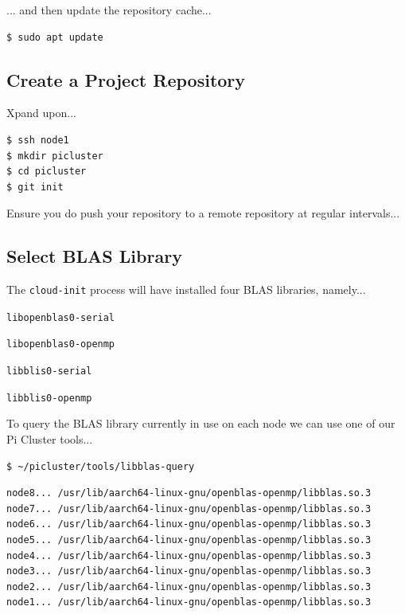 \documentclass{report}
\begin{document}
... and then update the repository cache...

\lstset{style=type}
\begin{lstlisting}[]
$ sudo apt update
\end{lstlisting}



\subsection{Create a Project Repository}

Xpand upon...

\lstset{style=type}
\begin{lstlisting}[]
$ ssh node1
$ mkdir picluster
$ cd picluster
$ git init
\end{lstlisting}

Ensure you do push your repository to a remote repository at regular intervals...


\subsection{Select BLAS Library}

The \verb|cloud-init| process will have installed four BLAS libraries, namely...

\verb|libopenblas0-serial|

\verb|libopenblas0-openmp|

\verb|libblis0-serial|

\verb|libblis0-openmp|

To query the BLAS library currently in use on each node we can use one of our Pi Cluster tools...

\lstset{style=type}
\begin{lstlisting}[]
$ ~/picluster/tools/libblas-query
\end{lstlisting}

\lstset{style=type}
\begin{lstlisting}[]
node8... /usr/lib/aarch64-linux-gnu/openblas-openmp/libblas.so.3
node7... /usr/lib/aarch64-linux-gnu/openblas-openmp/libblas.so.3
node6... /usr/lib/aarch64-linux-gnu/openblas-openmp/libblas.so.3
node5... /usr/lib/aarch64-linux-gnu/openblas-openmp/libblas.so.3
node4... /usr/lib/aarch64-linux-gnu/openblas-openmp/libblas.so.3
node3... /usr/lib/aarch64-linux-gnu/openblas-openmp/libblas.so.3
node2... /usr/lib/aarch64-linux-gnu/openblas-openmp/libblas.so.3
node1... /usr/lib/aarch64-linux-gnu/openblas-openmp/libblas.so.3
\end{lstlisting}
\end{document}
